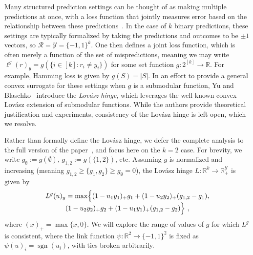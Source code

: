 \documentclass[12pt]{article}
\newcommand{\Comments}{1}
\newcommand{\mytodo}[2]{\ifnum\Comments=1%
  \todo[linecolor=#1!80!black,backgroundcolor=#1,bordercolor=#1!80!black]{#2}\fi}
\newcommand{\raft}[1]{\mytodo{green!20!white}{RF: #1}}
\newcommand{\reals}{\mathbb{R}}
\newcommand{\R}{\mathcal{R}}
\newcommand{\Y}{\mathcal{Y}}
\DeclareMathOperator*{\sgn}{sgn}
\begin{document}
Many structured prediction settings can be thought of as making multiple predictions at once, with a loss function that jointly measures error based on the relationship between these predictions~\cite{hazan2010direct, gao2011consistency, osokin2017structured}.
In the case of $k$ binary predictions, these settings are typically formalized by taking the predictions and outcomes to be $\pm 1$ vectors, so $\R=\Y=\{-1,1\}^k$.
One then defines a joint loss function, which is often merely a function of the set of mispredictions, meaning we may write $\ell^g(r)_y = g(\{i \in [k] : r_i \neq y_i\})$ for some set function $g:2^{[k]}\to\reals$.
For example, Hamming loss is given by $g(S) = |S|$.
In an effort to provide a general convex surrogate for these settings when $g$ is a submodular function, Yu and Blaschko~\cite{yu2018lovasz} introduce the \emph{Lov\'asz hinge}, which leverages the well-known convex Lov\'asz extension of submodular functions.
While the authors provide theoretical justification and experiments, consistency of the Lov\'asz hinge is left open, which we resolve.

Rather than formally define the Lov\'asz hinge, we defer the complete analysis to the full version of the paper~\cite{finocchiaro2019embedding}, and focus here on the $k=2$ case.
For brevity, we write $g_\emptyset := g(\emptyset)$, $g_{1,2} := g(\{1,2\})$, etc.
Assuming $g$ is normalized and increasing (meaning $g_{1,2} \geq \{g_1,g_2\} \geq g_\emptyset = 0$), the Lov\'asz hinge $L:\reals^k\to\reals^\Y_+$ is given by
\begin{multline}
  \label{eq:lovasz-hinge}
  L^g(u)_y = \max\Bigl\{(1-u_1y_1)_+ g_1 + (1-u_2y_2)_+ (g_{1,2}-g_1),\\[-4pt] (1-u_2y_2)_+ g_2 + (1-u_1y_1)_+ (g_{1,2}-g_2)\Bigr\}~,
\end{multline}
where $(x)_+ = \max\{x,0\}$.
We will explore the range of values of $g$ for which $L^g$ is consistent, where the link function $\psi:\reals^2\to\{-1,1\}^2$ is fixed as $\psi(u)_i = \sgn(u_i)$, with ties broken arbitrarily.
\end{document}
